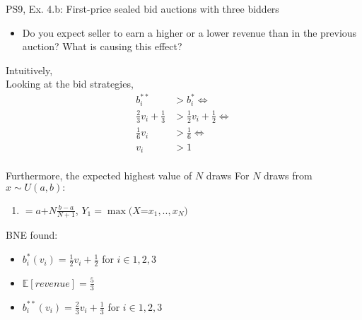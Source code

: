 \begin{frame}{PS9, Ex. 4.b: First-price sealed bid auctions with three bidders}
    \begin{itemize}
      \item[(b)] Do you expect seller to earn a higher or a lower revenue than in the previous auction? What is causing this effect?
    \end{itemize}
    \vspace{-8pt}
    \begin{multicols}{2}
    Intuitively, \\\smallskip
    Looking at the bid strategies,  \vspace{-2pt}
    \begin{align*}
      b_i^{**}&>b_i^{*}\Leftrightarrow\\
      \frac{2}{3}v_i+\frac{1}{3}&>\frac{1}{2}v_i+\frac{1}{2}\Leftrightarrow\\
      \frac{1}{6}v_i&>\frac{1}{6}\Leftrightarrow\\
                 v_i&>1
    \end{align*}
    \\\smallskip
    Furthermore, the expected highest value of $N$ draws 
    \vfill\null\columnbreak
    For $N$ draws from $x\sim U(a, b):$
    \vspace{-6pt}
    \begin{enumerate}
      \item[$\mathbb{E}(Y_1)$] $=a$+$N\frac{b-a}{N+1}$, $Y_1=\max(X$=$x_1,..,x_N)$
    \end{enumerate}
    \vspace{-6pt}
    BNE found:
    \begin{itemize}
      \item[(3.a)] $b_i^{*}(v_i)=\frac{1}{2}v_i+\frac{1}{2}$ for $i\in1,2,3$
      \item[(3.b)] $\mathbb{E}[revenue]=\frac{5}{3}$
      \item[(4.a)] $b_i^{**}(v_i)=\frac{2}{3}v_i+\frac{1}{3}$ for $i\in1,2,3$
    \end{itemize}
    \vfill\null
    \end{multicols}
\end{frame}


